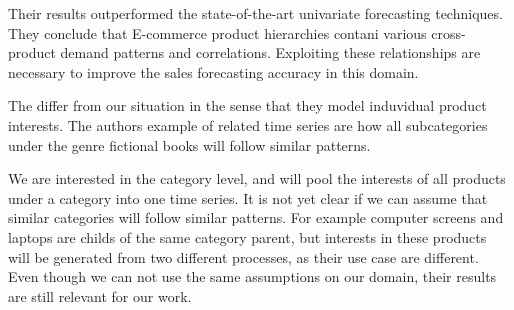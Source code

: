 Their results outperformed the state-of-the-art univariate forecasting techniques.
They conclude that E-commerce product hierarchies contani various cross-product demand
patterns and correlations. Exploiting these relationships are necessary to improve the sales forecasting
accuracy in this domain.

The \cite{Bandara2019} differ from our situation in the sense that they model
induvidual product interests. The authors example of related time series are how
all subcategories under the genre fictional books will follow similar patterns.

We are interested in the category level, and will pool the interests of all products under
a category into one time series. It is not yet clear if we can assume that similar categories 
will follow similar patterns. 
For example computer screens and laptops are childs of the same category parent, 
but interests in these products will be generated from two different processes, as their 
use case are different.
Even though we can not use the same assumptions on our domain, their results are still relevant
for our work.